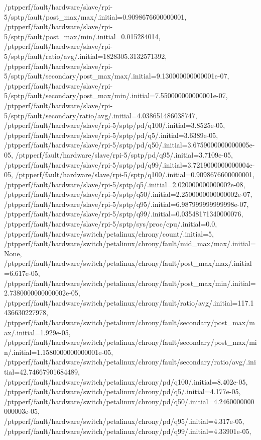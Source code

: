 {    /ptpperf/fault/hardware/slave/rpi-5/sptp/fault/post_max/max/.initial=0.9098676600000001,
    /ptpperf/fault/hardware/slave/rpi-5/sptp/fault/post_max/min/.initial=0.015284014,
    /ptpperf/fault/hardware/slave/rpi-5/sptp/fault/ratio/avg/.initial=1828305.3132571392,
    /ptpperf/fault/hardware/slave/rpi-5/sptp/fault/secondary/post_max/max/.initial=9.130000000000001e-07,
    /ptpperf/fault/hardware/slave/rpi-5/sptp/fault/secondary/post_max/min/.initial=7.550000000000001e-07,
    /ptpperf/fault/hardware/slave/rpi-5/sptp/fault/secondary/ratio/avg/.initial=4.038651486038747,
    /ptpperf/fault/hardware/slave/rpi-5/sptp/pd/q100/.initial=3.8525e-05,
    /ptpperf/fault/hardware/slave/rpi-5/sptp/pd/q5/.initial=3.6389e-05,
    /ptpperf/fault/hardware/slave/rpi-5/sptp/pd/q50/.initial=3.6759000000000005e-05,
    /ptpperf/fault/hardware/slave/rpi-5/sptp/pd/q95/.initial=3.7109e-05,
    /ptpperf/fault/hardware/slave/rpi-5/sptp/pd/q99/.initial=3.7219000000000004e-05,
    /ptpperf/fault/hardware/slave/rpi-5/sptp/q100/.initial=0.9098676600000001,
    /ptpperf/fault/hardware/slave/rpi-5/sptp/q5/.initial=2.020000000000002e-08,
    /ptpperf/fault/hardware/slave/rpi-5/sptp/q50/.initial=2.2500000000000002e-07,
    /ptpperf/fault/hardware/slave/rpi-5/sptp/q95/.initial=6.987999999999998e-07,
    /ptpperf/fault/hardware/slave/rpi-5/sptp/q99/.initial=0.03548171340000076,
    /ptpperf/fault/hardware/slave/rpi-5/sptp/sys/proc/cpu/.initial=0.0,
    /ptpperf/fault/hardware/switch/petalinux/chrony/count/.initial=5,
    /ptpperf/fault/hardware/switch/petalinux/chrony/fault/mid_max/max/.initial=None,
    /ptpperf/fault/hardware/switch/petalinux/chrony/fault/post_max/max/.initial=6.617e-05,
    /ptpperf/fault/hardware/switch/petalinux/chrony/fault/post_max/min/.initial=2.7380000000000002e-05,
    /ptpperf/fault/hardware/switch/petalinux/chrony/fault/ratio/avg/.initial=117.1436630227978,
    /ptpperf/fault/hardware/switch/petalinux/chrony/fault/secondary/post_max/max/.initial=1.929e-05,
    /ptpperf/fault/hardware/switch/petalinux/chrony/fault/secondary/post_max/min/.initial=1.1580000000000001e-05,
    /ptpperf/fault/hardware/switch/petalinux/chrony/fault/secondary/ratio/avg/.initial=42.74667901684489,
    /ptpperf/fault/hardware/switch/petalinux/chrony/pd/q100/.initial=8.402e-05,
    /ptpperf/fault/hardware/switch/petalinux/chrony/pd/q5/.initial=4.177e-05,
    /ptpperf/fault/hardware/switch/petalinux/chrony/pd/q50/.initial=4.2460000000000003e-05,
    /ptpperf/fault/hardware/switch/petalinux/chrony/pd/q95/.initial=4.317e-05,
    /ptpperf/fault/hardware/switch/petalinux/chrony/pd/q99/.initial=4.33901e-05,
}
